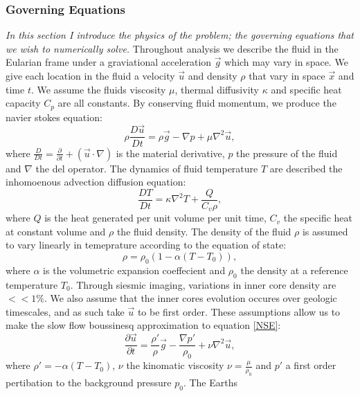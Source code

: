 \documentclass{article}
\begin{document}
\subsubsection*{Governing Equations}
{\it{In this section I introduce the physics of the problem; the governing equations that we wish to numerically solve.}}
\vspace{0.3cm}
\newline
\noindent Throughout analysis we describe the fluid in the Eularian frame under a graviational acceleration $\vec{g}$ which may vary in space. We give each location in the fluid a velocity $\vec{u}$ and density $\rho$ that vary in space $\vec{x}$ and time $t$. We assume the fluids viscosity $\mu$, thermal diffusivity $\kappa$ and specific heat capacity $C_p$ are all constants. By conserving fluid momentum, we produce the navier stokes equation:
\begin{equation}
	\rho \frac{D \vec{u}}{D t} = \rho \vec{g} - \nabla p + \mu \nabla^2 \vec{u},
	\label{NSE}
\end{equation}
where $\frac{D}{D t} = \frac{\partial }{\partial t} + (\vec{u} \cdot \nabla)$ is the material derivative, $p$ the pressure of the fluid and $\nabla$ the del operator. The dynamics of fluid temperature $T$ are described the inhomoenous advection diffusion equation:
\begin{equation}
	\frac{D T}{D t} = \kappa \nabla^2 T + \frac{Q}{C_v \rho},
	\label{adeT}
\end{equation}
where $Q$ is the heat generated per unit volume per unit time, $C_v$ the specific heat at constant volume and $\rho$ the fluid density. The density of the fluid $\rho$ is assumed to vary linearly in temeprature according to the equation of state:
\begin{equation}
	\rho = \rho_0 (1- \alpha(T - T_0)),
	\label{equation of state}
\end{equation}
where $\alpha$ is the volumetric expansion coeffecient and $\rho_0$ the density at a reference temperature $T_0$.
Through siesmic imaging, variations in inner core density are $<< 1 \%$. We also assume that the inner cores evolution occures over geologic timescales, and as such take $\vec{u}$ to be first order. These assumptions allow us to make the slow flow boussinesq approximation to equation \ref{NSE}:
\begin{equation}
	\frac{\partial \vec{u}}{\partial t} = \frac{\rho'}{\rho} \vec{g} -   \frac{\nabla p'}{\rho_0} + \nu \nabla^2 \vec{u},
	\label{NSE slow + boussinesq}
\end{equation}
where $\rho'=-\alpha(T - T_0)$, $\nu$ the kinomatic viscosity $\nu = \frac{\mu}{\rho_0}$ and $p'$ a first order pertibation to the background pressure $p_0$.
\newline
The Earths
\end{document}
